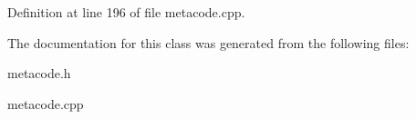 Definition at line 196 of file metacode.cpp.



The documentation for this class was generated from the following files:\begin{DoxyCompactItemize}
\item 
metacode.h\item 
metacode.cpp\end{DoxyCompactItemize}

